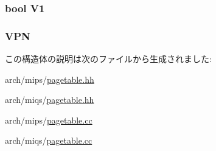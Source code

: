 \label{structMipsISA_1_1PTE_aef8a8ddc9558c9cff93b2610dddea958}
\hypertarget{structMipsISA_1_1PTE_a2de020451ec6119f325bc89847d6f44a}{
\subsubsection[{V1}]{\setlength{\rightskip}{0pt plus 5cm}bool {\bf V1}}}
\label{structMipsISA_1_1PTE_a2de020451ec6119f325bc89847d6f44a}
\hypertarget{structMipsISA_1_1PTE_a828b555e1478c60407431dd9f779f208}{
\subsubsection[{VPN}]{ {\bf VPN}}}
\label{structMipsISA_1_1PTE_a828b555e1478c60407431dd9f779f208}


この構造体の説明は次のファイルから生成されました:\begin{DoxyCompactItemize}
\item 
arch/mips/\hyperlink{mips_2pagetable_8hh}{pagetable.hh}\item 
arch/miqs/\hyperlink{miqs_2pagetable_8hh}{pagetable.hh}\item 
arch/mips/\hyperlink{mips_2pagetable_8cc}{pagetable.cc}\item 
arch/miqs/\hyperlink{miqs_2pagetable_8cc}{pagetable.cc}\end{DoxyCompactItemize}

